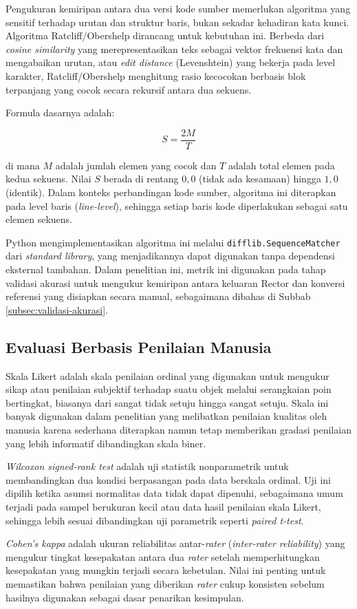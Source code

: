 Pengukuran kemiripan antara dua versi kode sumber memerlukan algoritma yang sensitif 
terhadap urutan dan struktur baris, bukan sekadar kehadiran kata kunci. Algoritma 
Ratcliff/Obershelp \cite{ratcliff1988gestalt} dirancang untuk kebutuhan ini. Berbeda 
dari \textit{cosine similarity} yang merepresentasikan teks sebagai vektor frekuensi 
kata dan mengabaikan urutan, atau \textit{edit distance} (Levenshtein) yang bekerja 
pada level karakter, Ratcliff/Obershelp menghitung rasio kecocokan berbasis blok 
terpanjang yang cocok secara rekursif antara dua sekuens.

Formula dasarnya adalah:

\begin{equation}
    S = \frac{2M}{T}
    \label{eq:ratcliff}
\end{equation}

di mana $M$ adalah jumlah elemen yang cocok dan $T$ adalah total elemen pada kedua 
sekuens. Nilai $S$ berada di rentang $0{,}0$ (tidak ada kesamaan) hingga $1{,}0$ 
(identik). Dalam konteks perbandingan kode sumber, algoritma ini diterapkan pada 
level baris (\textit{line-level}), sehingga setiap baris kode diperlakukan sebagai 
satu elemen sekuens.

Python mengimplementasikan algoritma ini melalui \texttt{difflib.SequenceMatcher}
dari \textit{standard library}, yang menjadikannya dapat digunakan tanpa dependensi
eksternal tambahan. Dalam penelitian ini, metrik ini digunakan pada tahap validasi
akurasi untuk mengukur kemiripan antara keluaran Rector dan konversi referensi yang
disiapkan secara manual, sebagaimana dibahas di Subbab \ref{subsec:validasi-akurasi}.

\subsection{Evaluasi Berbasis Penilaian Manusia}
\label{subsec:evaluasi-manusia}

Skala Likert \cite{likert1932technique} adalah skala penilaian ordinal yang
digunakan untuk mengukur sikap atau penilaian subjektif terhadap suatu objek
melalui serangkaian poin bertingkat, biasanya dari sangat tidak setuju hingga
sangat setuju. Skala ini banyak digunakan dalam penelitian yang melibatkan
penilaian kualitas oleh manusia karena sederhana diterapkan namun tetap
memberikan gradasi penilaian yang lebih informatif dibandingkan skala biner.

\textit{Wilcoxon signed-rank test} \cite{wilcoxon1945individual} adalah uji
statistik nonparametrik untuk membandingkan dua kondisi berpasangan pada data
berskala ordinal. Uji ini dipilih ketika asumsi normalitas data tidak dapat
dipenuhi, sebagaimana umum terjadi pada sampel berukuran kecil atau data hasil
penilaian skala Likert, sehingga lebih sesuai dibandingkan uji parametrik
seperti \textit{paired t-test}.

\textit{Cohen's kappa} \cite{cohen1960coefficient} adalah ukuran reliabilitas
antar-\textit{rater} (\textit{inter-rater reliability}) yang mengukur tingkat
kesepakatan antara dua \textit{rater} setelah memperhitungkan kesepakatan yang
mungkin terjadi secara kebetulan. Nilai ini penting untuk memastikan bahwa
penilaian yang diberikan \textit{rater} cukup konsisten sebelum hasilnya
digunakan sebagai dasar penarikan kesimpulan.